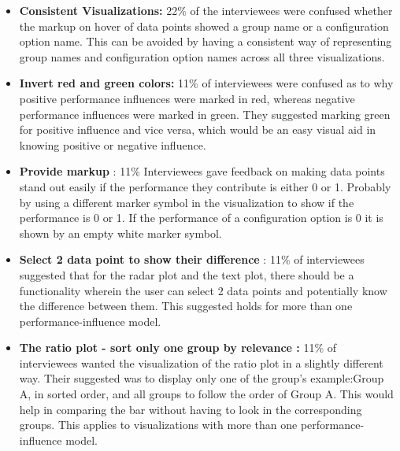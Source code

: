\begin{itemize}
\item \textbf{Consistent Visualizations: } 22\% of the interviewees were confused whether the markup on hover of data points showed a group name or a configuration option name. This can be avoided by having a consistent way of representing group names and configuration option names across all three visualizations. 

\item \textbf{Invert red and green colors:} 11\% of interviewees were confused as to why positive performance influences were marked in red, whereas negative performance influences were marked in green. They suggested marking green for positive influence and vice versa, which would be an easy visual aid in knowing positive or negative influence.
   
\item \textbf{Provide markup} : 11\% Interviewees gave feedback on making data points stand out easily if the performance they contribute is either 0 or 1. Probably by using a different marker symbol in the visualization to show if the performance is 0 or 1. If the performance of a configuration option is 0 it is shown by an empty white marker symbol.

\item \textbf{Select 2 data point to show their difference} : 11\% of interviewees suggested that for the radar plot and the text plot, there should be a functionality wherein the user can select 2 data points and potentially know the difference between them. This suggested holds for more than one performance-influence model.

\item \textbf{The ratio plot - sort only one group by relevance :} 11\% of interviewees wanted the visualization of the ratio plot in a slightly different way. Their suggested was to display only one of the group's example:Group A, in sorted order, and all groups to follow the order of Group A. This would help in comparing the bar without having to look in the corresponding groups. This applies to visualizations with more than one performance-influence model.

\end{itemize}


